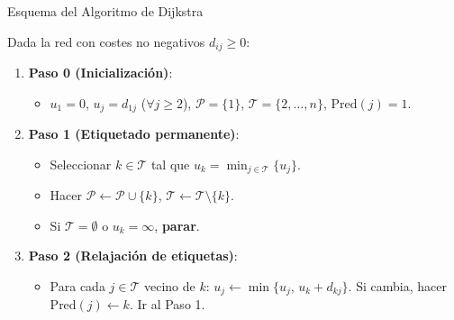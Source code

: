 \documentclass[
  ignorenonframetext,
]{beamer}
\providecommand{\tightlist}{%
  \setlength{\itemsep}{0pt}\setlength{\parskip}{0pt}}
\begin{document}
\begin{frame}{Esquema del Algoritmo de Dijkstra}
\label{esquema-del-algoritmo-de-dijkstra}
\begin{tcolorbox}[enhanced jigsaw, colframe=quarto-callout-note-color-frame, toptitle=1mm, colback=white, colbacktitle=quarto-callout-note-color!10!white, titlerule=0mm, breakable, coltitle=black, opacityback=0, bottomrule=.15mm, title=\textcolor{quarto-callout-note-color}{\faInfo}\hspace{0.5em}{Algoritmo de Dijkstra}, rightrule=.15mm, arc=.35mm, leftrule=.75mm, left=2mm, toprule=.15mm, bottomtitle=1mm, opacitybacktitle=0.6]

Dada la red con costes no negativos \(d_{ij} \ge 0\):

\begin{enumerate}
\tightlist
\item
  \textbf{Paso 0 (Inicialización)}:

  \begin{itemize}
  \tightlist
  \item
    \(u_1 = 0\), \(u_j = d_{1j}\) (\(\forall j \ge 2\)),
    \(\mathcal{P} = \{1\}\), \(\mathcal{T} = \{2, \dots, n\}\),
    \(\text{Pred}(j) = 1\).
  \end{itemize}
\item
  \textbf{Paso 1 (Etiquetado permanente)}:

  \begin{itemize}
  \tightlist
  \item
    Seleccionar \(k \in \mathcal{T}\) tal que
    \(u_k = \min_{j \in \mathcal{T}} \{ u_j \}\).
  \item
    Hacer \(\mathcal{P} \leftarrow \mathcal{P} \cup \{k\}\),
    \(\mathcal{T} \leftarrow \mathcal{T} \setminus \{k\}\).
  \item
    Si \(\mathcal{T} = \emptyset\) o \(u_k = \infty\), \textbf{parar}.
  \end{itemize}
\item
  \textbf{Paso 2 (Relajación de etiquetas)}:

  \begin{itemize}
  \tightlist
  \item
    Para cada \(j \in \mathcal{T}\) vecino de \(k\):
    \(u_j \leftarrow \min \{ u_j, \, u_k + d_{kj} \}\). Si cambia, hacer
    \(\text{Pred}(j) \leftarrow k\). Ir al Paso 1.
  \end{itemize}
\end{enumerate}

\end{tcolorbox}
\end{frame}
\end{document}

